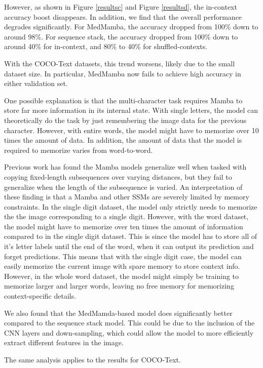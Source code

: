 However, as shown in Figure \ref{resultsc} and Figure \ref{resultsd}, the
in-context accuracy boost disappears.
In addition, we find that the overall performance degrades significantly.
For MedMamba, the accuracy dropped from 100\% down to around 98\%.
For sequence stack, the accuracy dropped from 100\% down to around 40\% for
in-context, and 80\% to 40\% for shuffled-contexts.

With the COCO-Text datasets, this trend worsens, likely due to the small dataset
size.
In particular, MedMamba now fails to achieve high accuracy in either validation
set.

One possible explanation is that the multi-character task requires Mamba to
store far more information in its internal state.
With single letters, the model can theoretically do the task by just remembering
the image data for the previous character.
However, with entire words, the model might have to memorize over 10 times the
amount of data.
In addition, the amount of data that the model is required to memorize varies
from word-to-word.

Previous work \cite{mambangram} has found the Mamba models generalize well when
tasked with copying fixed-length subsequences over varying distances, but they
fail to generalize when the length of the subsequence is varied.
An interpretation of these finding is that a Mamba and other SSMs are severely
limited by memory constraints.
In the single digit dataset, the model only strictly needs to memorize the the
image corresponding to a single digit.
However, with the word dataset, the model might have to memorize over ten times
the amount of information compared to in the single digit dataset.
This is since the model has to store all of it's letter labels until the end of
the word, when it can output its prediction and forget predictions.
This means that with the single digit case, the model can easily memorize the
current image with spare memory to store context info.
However, in the whole word dataset, the model might simply be training to
memorize larger and larger words, leaving no free memory for memorizing
context-specific details.

We also found that the MedMamda-based model does significantly better compared
to the sequence stack model.
This could be due to the inclusion of the CNN layers and down-sampling, which
could allow the model to more efficiently extract different features in the
image.

The same analysis applies to the results for COCO-Text.
